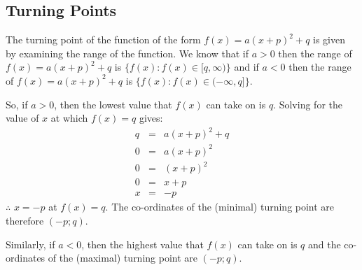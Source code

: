 {{\subsection{Turning Points}
The turning point of the function of the form $f(x)=a(x+p)^2+q$ is given by examining the range of the function. We know that if $a>0$ then the range of $f(x)=a(x+p)^2+q$ is $\{f(x):f(x)\in[q,\infty)\}$ and if $a<0$ then the range of $f(x)=a(x+p)^2+q$ is $\{f(x):f(x)\in(-\infty,q]\}$.

So, if $a>0$, then the lowest value that $f(x)$ can take on is $q$. Solving for the value of $x$ at which $f(x)=q$ gives:
\begin{eqnarray*}
q&=&a(x+p)^2+q\\
0&=&a(x+p)^2\\
0&=&(x+p)^2\\
0&=&x+p\\
x&=&-p
\end{eqnarray*}
$\therefore$ $x=-p$ at $f(x)=q$. The co-ordinates of the (minimal) turning point are therefore $(-p;q)$.

Similarly, if $a<0$, then the highest value that $f(x)$ can take on is $q$ and the co-ordinates of the (maximal) turning point are $(-p;q)$.

}}
